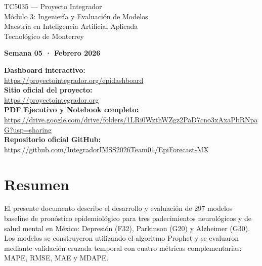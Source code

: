 \documentclass[11pt,a4paper]{article}
\begin{document}
\begin{center}
\vspace{0.8cm}

{\large TC5035 — Proyecto Integrador\\
Módulo 3: Ingeniería y Evaluación de Modelos\\[0.2cm]
Maestría en Inteligencia Artificial Aplicada\\
Tecnológico de Monterrey}

\vspace{0.5cm}

{\large\bfseries Semana 05 · Febrero 2026}

\vspace{1.0cm}

\begin{flushleft}
\small
\textcolor{imss-teal}{\textbf{Dashboard interactivo:}}\\
\url{https://proyectointegrador.org/epidashboard}\\[0.25cm]
\textcolor{imss-teal}{\textbf{Sitio oficial del proyecto:}}\\
\url{https://proyectointegrador.org}\\[0.25cm]
\textcolor{imss-teal}{\textbf{PDF Ejecutivo y Notebook completo:}}\\
\url{https://drive.google.com/drive/folders/1LRi0WzthWZgz2PaD7cno3xAxaPbRNpaG?usp=sharing}\\[0.25cm]
\textcolor{imss-teal}{\textbf{Repositorio oficial GitHub:}}\\
\url{https://github.com/IntegradorIMSS2026Team01/EpiForecast-MX}
\end{flushleft}

\end{center}

\newpage

\section*{Resumen}

El presente documento describe el desarrollo y evaluación de 297 modelos baseline de pronóstico epidemiológico para tres padecimientos neurológicos y de salud mental en México: Depresión (F32), Parkinson (G20) y Alzheimer (G30). Los modelos se construyeron utilizando el algoritmo Prophet \citep{taylor2018forecasting} y se evaluaron mediante validación cruzada temporal con cuatro métricas complementarias: MAPE, RMSE, MAE y MDAPE.
\end{document}
